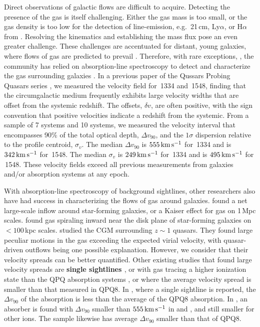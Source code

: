 \documentclass[iop]{emulateapj}
\begin{document}
Direct observations of galactic flows are difficult to acquire. Detecting the presence of
the gas is itself challenging. Either the gas mass is too small, or the gas density is too low for
the detection of line-emission, e.g.\ 21\,cm, Ly$\alpha$, or H$\alpha$ from . Resolving
the kinematics and establishing the mass flux pose an even greater challenge. These challenges are
accentuated for distant, young galaxies, where flows of gas are predicted to prevail
\citep{Keres+09,Fumagalli+11}. Therefore, with rare exceptions,
\citep[e.g.][]{Cantalupo+14,Hennawi+15}, the community has relied on absorption-line spectroscopy
to detect and characterize the gas surrounding galaxies
\citep[e.g.][]{BergeronBoisse91,Steidel+10,Prochaska+11,Tumlinson+13}.
In a previous paper of the Qussars Probing Quasars series \citep[][, hereafter QPQ8]{QPQ8}, we
measured the velocity field for \,1334 and \,1548, finding that the
circumgalactic medium frequently exhibits large velocity widths that are offset from the systemic
redshift. The offsets, $\delta v$, are often positive, with the sign convention that positive
velocities indicate a redshift from the systemic. From a sample of 7  systems and 10
 systems, we measured the velocity interval that encompasses 90\% of the total optical
depth, $\Delta v_{90}$, and the $1\sigma$ dispersion relative to the profile centroid, $\sigma_v$.
The median $\Delta v_{90}$ is $555\,{\rm km\,s^{-1}}$ for \,1334 and is
$342\,{\rm km\,s^{-1}}$ for \,1548. The median $\sigma_v$ is $249\,{\rm km\,s^{-1}}$ for
\,1334 and is $495\,{\rm km\,s^{-1}}$ for \,1548. These velocity fields exceed
all previous measurements from galaxies and/or absorption systems at any epoch.

With absorption-line spectroscopy of background sightlines, other researchers also have had
success in characterizing the flows of gas around galaxies. \cite{Rakic+12} found a net
large-scale inflow around star-forming galaxies, or a Kaiser effect for gas on
1\,Mpc scales. \cite{Ho+17} found gas spiraling inward near the disk plane of
star-forming galaxies on $<100$\,kpc scales. \cite{Johnson+15} studied the CGM surrounding
$z\sim1$ quasars. They found large peculiar motions in the gas exceeding the expected virial
velocity, with quasar-driven outflows being one possible explanation. However, we consider that
their velocity spreads can be better quantified. Other
existing studies that found large velocity spreads are {\bf single sightlines
\citep[e.g.,][]{Tripp+11,RudieNewmanMurphy17}}, or with gas tracing
a higher ionization state than the QPQ absorption systems \citep[e.g.,][]{Churchill+12}, or where
the average velocity spread is smaller than that measured in QPQ8. In \cite{Gauthier13}, where a
single sightline is reported, the $\Delta v_{90}$ of the  absorption is less than the
average of the QPQ8  absorption. In \cite{Muzahid+15}, an absorber is found with
$\Delta v_{90}$ smaller than $555\,{\rm km\,s^{-1}}$ in  and , and still
smaller for other ions. The \cite{Zahedy+16} sample likewise has average $\Delta v_{90}$ smaller
than that of QPQ8.
\end{document}
